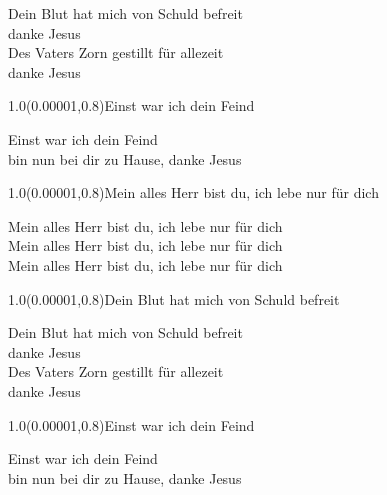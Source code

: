 \documentclass[aspectratio=169]{beamer}
\begin{document}
\begin{frame}
\centering
\color{white}
\huge{Dein Blut hat mich von Schuld befreit} \\
\huge{danke Jesus} \\
\huge{Des Vaters Zorn gestillt für allezeit} \\
\huge{danke Jesus} \\

\begin{textblock}{1.0}(0.00001,0.8)\color{gray}\normalsize{Einst war ich dein Feind}\end{textblock}
\end{frame}

\begin{frame}
\centering
\color{white}
\huge{Einst war ich dein Feind} \\
\huge{bin nun bei dir zu Hause, danke Jesus} \\

\begin{textblock}{1.0}(0.00001,0.8)\color{gray}\normalsize{Mein alles Herr bist du, ich lebe nur für dich}\end{textblock}
\end{frame}

\begin{frame}
\centering
\color{white}
\huge{Mein alles Herr bist du, ich lebe nur für dich} \\
\huge{Mein alles Herr bist du, ich lebe nur für dich} \\
\huge{Mein alles Herr bist du, ich lebe nur für dich} \\

\begin{textblock}{1.0}(0.00001,0.8)\color{gray}\normalsize{Dein Blut hat mich von Schuld befreit}\end{textblock}
\end{frame}

\begin{frame}
\centering
\color{white}
\huge{Dein Blut hat mich von Schuld befreit} \\
\huge{danke Jesus} \\
\huge{Des Vaters Zorn gestillt für allezeit} \\
\huge{danke Jesus} \\

\begin{textblock}{1.0}(0.00001,0.8)\color{gray}\normalsize{Einst war ich dein Feind}\end{textblock}
\end{frame}

\begin{frame}
\centering
\color{white}
\huge{Einst war ich dein Feind} \\
\huge{bin nun bei dir zu Hause, danke Jesus} \\
\end{frame}
\end{document}
